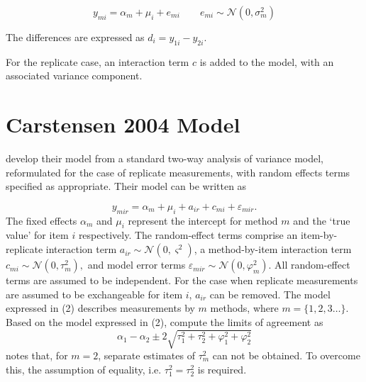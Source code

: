 \documentclass[12pt, a4paper]{report}
\theoremstyle{plain}
\theoremstyle{definition}
\theoremstyle{remark}
\begin{document}
%




%

\begin{equation}
y_{mi}  = \alpha_{m} + \mu_{i} + e_{mi} \qquad  e_{mi} \sim \mathcal{N}(0,\sigma^{2}_{m})
\end{equation}

The differences are expressed as $d_{i} = y_{1i} - y_{2i}$.

For the replicate case, an interaction term $c$ is added to the model, with an associated variance component.


\section{Carstensen 2004 Model}


\bigskip

\citet{BXC2008} develop their model from a standard two-way analysis of variance model, reformulated for the case of replicate measurements, with random effects terms specified as appropriate.
Their model can be written as

\begin{equation}\label{BXC-model}
y_{mir}  = \alpha_{m} + \mu_{i} + a_{ir} + c_{mi} + \varepsilon_{mir}.
\end{equation}
The fixed effects $\alpha_{m}$ and $\mu_{i}$ represent the intercept for method $m$ and the `true value' for item $i$ respectively. The random-effect terms comprise an item-by-replicate interaction term $a_{ir} \sim \mathcal{N}(0,\varsigma^{2})$, a method-by-item interaction term $c_{mi} \sim \mathcal{N}(0,\tau^{2}_{m}),$ and model error terms $\varepsilon_{mir} \sim \mathcal{N}(0,\varphi^{2}_{m}).$ All random-effect terms are assumed to be independent. For the case when replicate measurements are assumed to be exchangeable for item $i$, $a_{ir}$ can be removed. The model expressed in (2) describes measurements by $m$ methods, where $m = \{1,2,3\ldots\}$. Based on the model expressed in (2), \citet{BXC2008} compute the limits of agreement as
\[
\alpha_1 - \alpha_2 \pm 2 \sqrt{ \tau^2_1 +  \tau^2_2 +  \varphi^2_1 +  \varphi^2_2 }
\]
\citet{BXC2008} notes that, for $m=2$,  separate estimates of $\tau^2_m$ can not be obtained. To overcome this, the assumption of equality, i.e. $\tau^2_1 = \tau^2_2$ is required.
\end{document}
